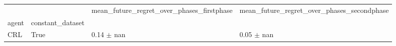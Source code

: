 \begin{tabular}{llll}
\toprule
 &  & mean_future_regret_over_phases_firstphase & mean_future_regret_over_phases_secondphase \\
agent & constant_dataset &  &  \\
\midrule
CRL & True & 0.14 $\pm$ nan & 0.05 $\pm$ nan \\
\cline{1-4}
\bottomrule
\end{tabular}
